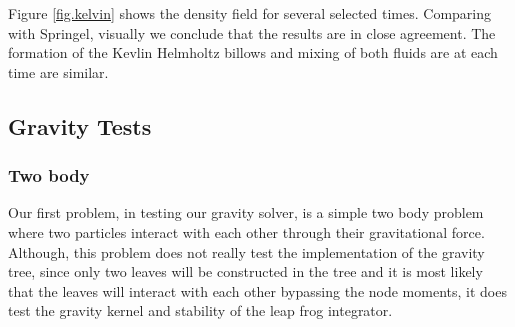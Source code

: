 Figure \ref{fig.kelvin} shows the density field for several selected times. Comparing with
Springel, visually we conclude that the results are in close agreement. The formation of the
Kevlin Helmholtz billows and mixing of both fluids are at each time are similar.

\subsection{Gravity Tests}
\subsubsection{Two body}
Our first problem, in testing our gravity solver, is a simple two body problem where two particles
interact with each other through their gravitational force. Although, this problem does not really test the 
implementation of the gravity tree, since only two leaves will be constructed
in the tree and it is most likely that the leaves will interact with each other bypassing the node 
moments, it does test the gravity kernel and stability of the leap frog integrator.

